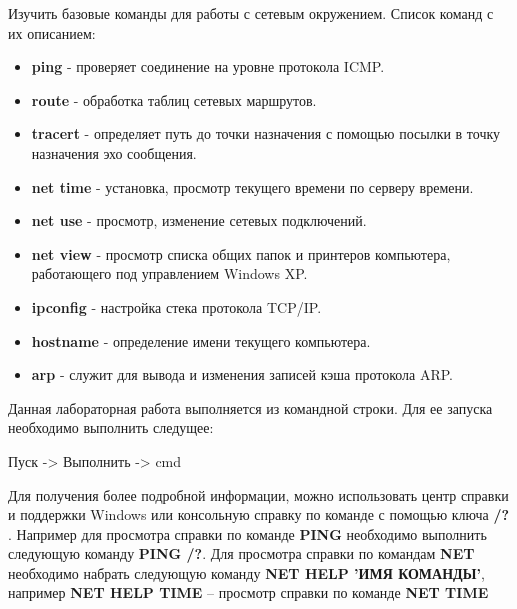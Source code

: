 \documentclass[a4paper,12pt]{article}
\begin{document}
  
  \begin{flushleft}
    Изучить базовые команды для работы с сетевым окружением.
    Список команд с их описанием:
    \begin{itemize}
     \item {\bf ping} - проверяет соединение на уровне протокола ICMP.
     \item {\bf route} - обработка таблиц сетевых маршрутов.
     \item {\bf tracert} - определяет путь до точки назначения с помощью посылки в точку назначения эхо сообщения.
     \item {\bf net time} - установка, просмотр текущего времени по серверу времени.
     \item {\bf net use} - просмотр, изменение сетевых подключений.
     \item {\bf net view} - просмотр списка общих папок и принтеров компьютера, работающего под управлением Windows XP.
     \item {\bf ipconfig} - настройка стека протокола TCP/IP.
     \item {\bf hostname} - определение имени текущего компьютера.
     \item {\bf arp} - служит для вывода и изменения записей кэша протокола ARP.
    \end{itemize}
  \end{flushleft}
  

  \begin{flushleft}
    Данная лабораторная работа выполняется из командной строки. Для ее запуска необходимо выполнить следущее:
    \begin{flushleft}
      Пуск -> Выполнить -> cmd \\[0.4cm]
    \end{flushleft}
  \end{flushleft}

  \begin{flushleft}
   Для получения более подробной информации, можно использовать центр справки и поддержки Windows или консольную справку по команде с помощью ключа {\bf /?} . Например для просмотра справки по команде {\bf PING} необходимо выполнить следующую команду {\bf PING /?}. Для просмотра справки по командам {\bf NET} необходимо набрать следующую команду {\bf NET HELP 'ИМЯ КОМАНДЫ'}, например {\bf NET HELP TIME} – просмотр справки по команде {\bf NET TIME} \\[0.2cm]
  \end{flushleft}
\end{document}
